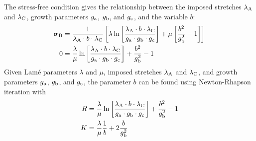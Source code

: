 \documentclass[10pt,letterpaper,oneside]{report}
\newcommand{\ten}[1]{\mbox{\boldmath $#1$}{}}
\newcommand{\scas}[1]{\mbox{{\scriptsize{${\rm{#1}}$}}}{}}
\begin{document}
The stress-free condition gives the relationship between the imposed stretches $\lambda_{\scas{A}}$ and $\lambda_{\scas{C}}$, growth parameters $g_{\scas{a}}$, $g_{\scas{b}}$, and $g_{\scas{c}}$, and the variable $b$:
\begin{align}
\ten{\sigma}_{\scas{B}} &= \frac{1}{\lambda_{\scas{A}} \cdot b \cdot \lambda_{\scas{C}}} \left[ \lambda \ln \left[ \frac{\lambda_{\scas{A}} \cdot b \cdot \lambda_{\scas{C}} }{g_{\scas{a}} \cdot g_{\scas{b}} \cdot g_{\scas{c}}} \right] + \mu \left[ \frac{b^2}{g_{\scas{b}}^2} - 1 \right] \right] \\
0 &= \frac{\lambda}{\mu} \ln \left[ \frac{\lambda_{\scas{A}} \cdot b \cdot \lambda_{\scas{C}} }{g_{\scas{a}} \cdot g_{\scas{b}} \cdot g_{\scas{c}}} \right] + \frac{b^2}{g_{\scas{b}}^2} - 1 
\end{align}
Given Lamé parameters $\lambda$ and $\mu$, imposed stretches $\lambda_{\scas{A}}$ and $\lambda_{\scas{C}}$, and growth parameters $g_{\scas{a}}$, $g_{\scas{b}}$, and $g_{\scas{c}}$, the parameter $b$ can be found using Newton-Rhapson iteration with 
\begin{align}
R &= \frac{\lambda}{\mu} \ln \left[ \frac{\lambda_{\scas{A}} \cdot b \cdot \lambda_{\scas{C}} }{g_{\scas{a}} \cdot g_{\scas{b}} \cdot g_{\scas{c}}} \right] + \frac{b^2}{g_{\scas{b}}^2} - 1 \\
K &= \frac{\lambda}{\mu} \frac{1}{b} + 2 \frac{b}{g_{\scas{b}}^2}
\end{align}
\end{document}

